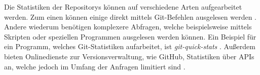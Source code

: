 Die Statistiken der Repositorys können auf verschiedene Arten aufgearbeitet werden.
Zum einen können einige direkt mittels Git-Befehlen ausgelesen werden \autocite{chacon_git_2024}.
Andere wiederum benötigen komplexere Abfragen, welche beispielsweise mittels Skripten oder speziellen Programmen ausgelesen werden können.
Ein Beispiel für ein Programm, welches Git-Statistiken aufarbeitet, ist \emph{git-quick-stats} \autocite{mestan_git-quick-stats_2024}.
Außerdem bieten Onlinedienste zur Versionsverwaltung, wie GitHub, Statistiken über APIs an, welche jedoch im Umfang der Anfragen limitiert sind \autocite{github_rate_2022}.

